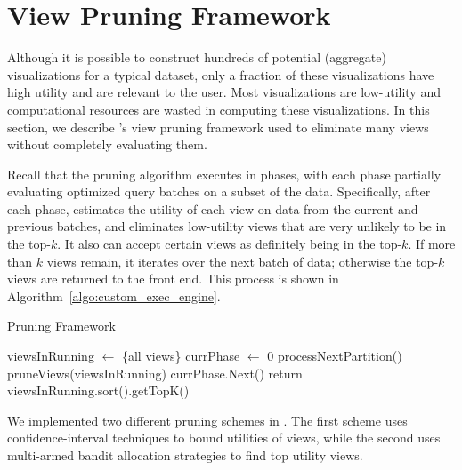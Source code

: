 
\section{View Pruning Framework}
\label{sec:pruning_framework}
Although it is possible to construct hundreds of potential (aggregate)
visualizations for a typical dataset, only a fraction of these visualizations have high utility and are relevant to the user.
Most visualizations are low-utility and computational resources
are wasted in computing these visualizations.
In this section, we describe \SeeDB's view pruning framework used to 
eliminate many views without completely evaluating them.

\label{subsec:basic_framework}
Recall that the pruning algorithm executes in phases, with each phase partially evaluating optimized query batches
on a subset of the data.
Specifically, after each phase, \SeeDB estimates the utility of each view on data from the current and previous batches, and eliminates
low-utility views that are very unlikely to be in the top-$k$.  It also can accept certain views as definitely being in the top-$k$.
If more than $k$ views remain, it iterates over the next batch of data;  otherwise the top-$k$ views are returned to the front end.
This process is shown in Algorithm~\ref{algo:custom_exec_engine}.


\begin{algorithm}[h]
\caption{Pruning Framework}
\label{algo:custom_exec_engine}
\begin{algorithmic}[1]
\State viewsInRunning $\gets$ \{all views\}
\State currPhase $\gets$ 0
\State processNextPartition()
\State pruneViews(viewsInRunning)
\State currPhase.Next()
\EndIf
\EndWhile
\State return viewsInRunning.sort().getTopK()
\end{algorithmic}
\end{algorithm}


We implemented two different pruning schemes in \SeeDB.
The first scheme uses  confidence-interval
techniques to bound utilities of views, while the second uses
multi-armed bandit allocation strategies to find top utility views.

